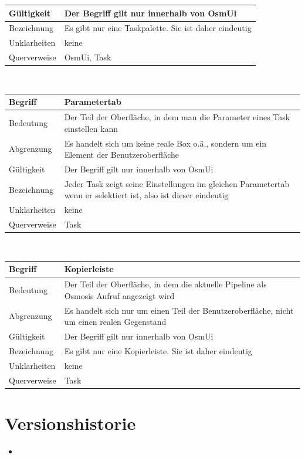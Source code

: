 \documentclass[a4paper,12pt]{scrartcl}
\begin{document}
\begin{center}
\begin{tabular}{|p{5cm}|p{10cm}|}
\hline Gültigkeit & Der Begriff gilt nur innerhalb von OsmUi \\ 
\hline Bezeichnung & Es gibt nur eine Taskpalette. Sie ist daher eindeutig \\ 
\hline Unklarheiten & keine \\ 
\hline Querverweise & OsmUi, Task\\ 
\hline 
\end{tabular}
\vspace{0.7cm}
\\
\begin{tabular}{|p{5cm}|p{10cm}|}
\hline Begriff & \textbf{Parametertab} \\ 
\hline Bedeutung & Der Teil der Oberfläche, in dem man die Parameter eines Task einstellen kann  \\ 
\hline Abgrenzung & Es handelt sich um keine reale Box o.ä., sondern um ein Element der Benutzeroberfläche\\ 
\hline Gültigkeit & Der Begriff gilt nur innerhalb von OsmUi \\ 
\hline Bezeichnung & Jeder Task zeigt seine Einstellungen im gleichen Parametertab wenn er selektiert ist, also ist dieser eindeutig \\ 
\hline Unklarheiten & keine \\ 
\hline Querverweise & Task \\ 
\hline 
\end{tabular}
\vspace{0.7cm}
\\
\begin{tabular}{|p{5cm}|p{10cm}|}
\hline Begriff & \textbf{Kopierleiste} \\ 
\hline Bedeutung & Der Teil der Oberfläche, in dem die aktuelle Pipeline als Osmosis Aufruf angezeigt wird \\ 
\hline Abgrenzung & Es handelt sich nur um einen Teil der Benutzeroberfläche, nicht um einen realen Gegenstand \\ 
\hline Gültigkeit & Der Begriff gilt nur innerhalb von OsmUi \\ 
\hline Bezeichnung & Es gibt nur eine Kopierleiste. Sie ist daher eindeutig \\ 
\hline Unklarheiten & keine \\ 
\hline Querverweise & Task \\ 
\hline 
\end{tabular}
\end{center}
\section{Versionshistorie}
\begin{itemize}
\item 
\end{itemize}
\end{document}
